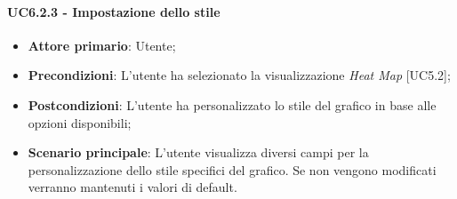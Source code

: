 \paragraph{UC6.2.3 - Impostazione dello stile}
\begin{itemize}
	\item \textbf{Attore primario}: Utente;
	\item \textbf{Precondizioni}: L'utente ha selezionato la visualizzazione \textit{Heat Map} [UC5.2];
	\item \textbf{Postcondizioni}: L'utente ha personalizzato lo stile del grafico in base alle opzioni disponibili;
	
	\item \textbf{Scenario principale}: L'utente visualizza diversi campi per la personalizzazione dello stile specifici del grafico. Se non vengono modificati verranno mantenuti i valori di default. 
\end{itemize}